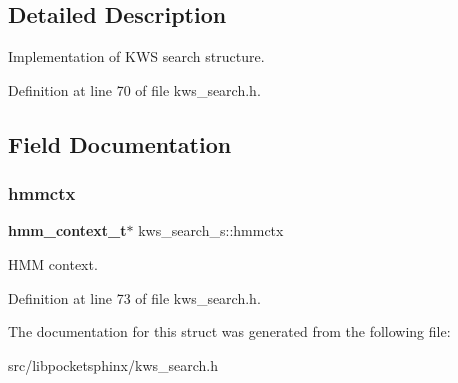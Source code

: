 \subsection{Detailed Description}
Implementation of K\+WS search structure. 

Definition at line 70 of file kws\+\_\+search.\+h.



\subsection{Field Documentation}
\mbox{\label{structkws__search__s_a0069d57702f921cbd1e2093148e7b672}} 
\subsubsection{hmmctx}
{\footnotesize\ttfamily \textbf{ hmm\+\_\+context\+\_\+t}$\ast$ kws\+\_\+search\+\_\+s\+::hmmctx}



H\+MM context. 



Definition at line 73 of file kws\+\_\+search.\+h.



The documentation for this struct was generated from the following file\+:\begin{DoxyCompactItemize}
\item 
src/libpocketsphinx/kws\+\_\+search.\+h\end{DoxyCompactItemize}
